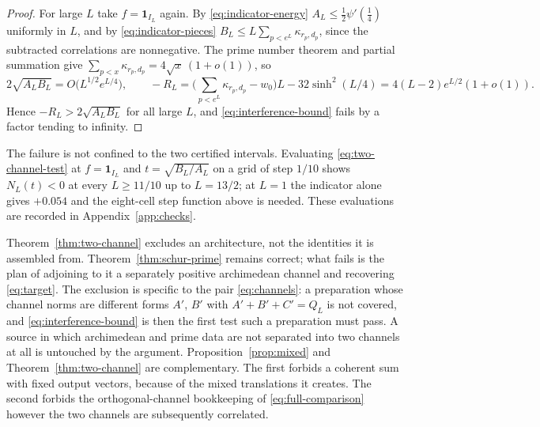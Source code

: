 \begin{proof}
For large $L$ take $f=\mathbf 1_{I_L}$ again. By \eqref{eq:indicator-energy}
$A_L\leq\tfrac12\psi'(\tfrac14)$ uniformly in $L$, and by
\eqref{eq:indicator-pieces} $B_L\leq L\sum_{p<e^L}\kappa_{r_p,d_p}$, since
the subtracted correlations are nonnegative. The prime number theorem and
partial summation give
$\sum_{p<x}\kappa_{r_p,d_p}=4\sqrt x\,(1+o(1))$, so
\[
 2\sqrt{A_LB_L}=O\big(L^{1/2}e^{L/4}\big),
 \qquad
 -R_L=\Big(\sum_{p<e^L}\kappa_{r_p,d_p}-w_0\Big)L-32\sinh^2(L/4)
 =4(L-2)e^{L/2}(1+o(1)).
\]
Hence $-R_L>2\sqrt{A_LB_L}$ for all large $L$, and
\eqref{eq:interference-bound} fails by a factor tending to infinity.
\end{proof}

\begin{remark}\label{rem:scan}
The failure is not confined to the two certified intervals. Evaluating
\eqref{eq:two-channel-test} at $f=\mathbf 1_{I_L}$ and $t=\sqrt{B_L/A_L}$
on a grid of step $1/10$ shows $N_L(t)<0$ at every $L\geq11/10$ up to
$L=13/2$; at $L=1$ the indicator alone gives $+0.054$ and the eight-cell
step function above is needed. These evaluations are recorded in
Appendix~\ref{app:checks}.
\end{remark}

Theorem~\ref{thm:two-channel} excludes an architecture, not the identities it
is assembled from. Theorem~\ref{thm:schur-prime} remains correct; what fails
is the plan of adjoining to it a separately positive archimedean channel and
recovering \eqref{eq:target}. The exclusion is specific to the pair
\eqref{eq:channels}: a preparation whose channel norms are different forms
$A'$, $B'$ with $A'+B'+C'=Q_L$ is not covered, and
\eqref{eq:interference-bound} is then the first test such a preparation must
pass. A source in which archimedean and prime data are not separated into two
channels at all is untouched by the argument.
Proposition~\ref{prop:mixed} and Theorem~\ref{thm:two-channel} are
complementary. The first forbids a coherent sum with fixed output vectors,
because of the mixed translations it creates. The second forbids the
orthogonal-channel bookkeeping of \eqref{eq:full-comparison} however the two
channels are subsequently correlated.
